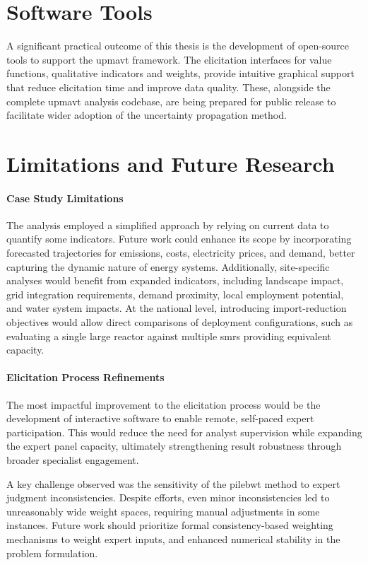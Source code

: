 \section{Software Tools}
A significant practical outcome of this thesis is the development of open-source tools to support the \gls{upmavt} framework. The elicitation interfaces for value functions, qualitative indicators and weights, provide intuitive graphical support that reduce elicitation time and improve data quality. These, alongside the complete \gls{upmavt} analysis codebase, are being prepared for public release to facilitate wider adoption of the uncertainty propagation method.

\section{Limitations and Future Research}
\paragraph{Case Study Limitations}
The analysis employed a simplified approach by relying on current data to quantify some indicators. Future work could enhance its scope by incorporating forecasted trajectories for emissions, costs, electricity prices, and demand, better capturing the dynamic nature of energy systems. Additionally, site-specific analyses would benefit from expanded indicators, including landscape impact, grid integration requirements, demand proximity, local employment potential, and water system impacts. At the national level, introducing import-reduction objectives would allow direct comparisons of deployment configurations, such as evaluating a single large reactor against multiple \glspl{smr} providing equivalent capacity.

\paragraph{Elicitation Process Refinements}
The most impactful improvement to the elicitation process would be the development of interactive software to enable remote, self-paced expert participation. This would reduce the need for analyst supervision while expanding the expert panel capacity, ultimately strengthening result robustness through broader specialist engagement.

A key challenge observed was the sensitivity of the \gls{pilebwt} method to expert judgment inconsistencies. Despite efforts, even minor inconsistencies led to unreasonably wide weight spaces, requiring manual adjustments in some instances. Future work should prioritize formal consistency-based weighting mechanisms to weight expert inputs, and enhanced numerical stability in the problem formulation.

